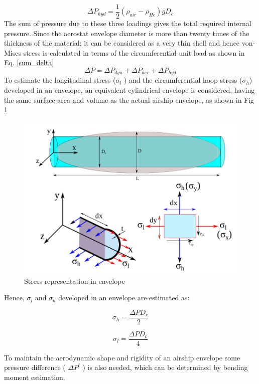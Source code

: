 \begin{equation}
\label{hyd}
\Delta P_{hyd} = \frac{1}{2} (\rho _{air} - \rho_{He} ) g D_{c}
\end{equation}
The sum of pressure due to these three loadings gives the total required internal pressure. Since the aerostat envelope diameter is more than twenty times of the thickness of the material; it can be considered as a very thin shell and hence von-Mises stress is calculated in terms of the circumferential unit load as shown in Eq. \ref{sum_delta}
\begin{equation}
\label{sum_delta}
\Delta P = \Delta P_{dyn} + \Delta P_{aer} + \Delta P_{hyd}
\end{equation}
To estimate the longitudinal stress ($ \sigma _{l} $ ) and the circumferential hoop stress ($ \sigma _{h} $) developed in an envelope, an equivalent cylindrical envelope is considered, having the same surface area and volume as the actual airship envelope, as shown in Fig \ref{Stress representation in envelope}

\begin{figure}[H]
	\centering	\includegraphics[width=0.7\linewidth]{von_mises/stress_rep_envelope.png}
	\caption{Stress representation in envelope }
	\label{Stress representation in envelope}
\end{figure}
Hence, $ \sigma _{l} $ and $ \sigma _{h} $ developed in an envelope are estimated as:

\begin{equation}
 \sigma _{h} = \frac{\Delta P D_{c}}{2}
\end{equation}

\begin{equation}
\sigma _{l} = \frac{\Delta P D_{c}}{4}
\end{equation}

To maintain the aerodynamic shape and rigidity of an airship envelope some pressure difference ( $ \Delta P^{'} $ ) is also needed, which can be determined by bending moment estimation.

